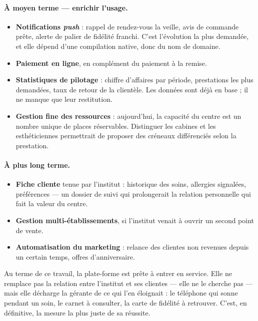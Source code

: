 \paragraph{À moyen terme --- enrichir l'usage.}
\begin{itemize}[leftmargin=1.2cm,nosep]
  \item \textbf{Notifications \textit{push}} : rappel de rendez-vous la veille,
  avis de commande prête, alerte de palier de fidélité franchi. C'est
  l'évolution la plus demandée, et elle dépend d'une compilation native, donc
  du nom de domaine.
  \item \textbf{Paiement en ligne}, en complément du paiement à la remise.
  \item \textbf{Statistiques de pilotage} : chiffre d'affaires par période,
  prestations les plus demandées, taux de retour de la clientèle. Les données
  sont déjà en base ; il ne manque que leur restitution.
  \item \textbf{Gestion fine des ressources} : aujourd'hui, la capacité du
  centre est un nombre unique de places réservables. Distinguer les cabines et
  les esthéticiennes permettrait de proposer des créneaux différenciés selon la
  prestation.
\end{itemize}

\paragraph{À plus long terme.}
\begin{itemize}[leftmargin=1.2cm,nosep]
  \item \textbf{Fiche cliente} tenue par l'institut : historique des soins,
  allergies signalées, préférences --- un dossier de suivi qui prolongerait la
  relation personnelle qui fait la valeur du centre.
  \item \textbf{Gestion multi-établissements}, si l'institut venait à ouvrir un
  second point de vente.
  \item \textbf{Automatisation du marketing} : relance des clientes non revenues
  depuis un certain temps, offres d'anniversaire.
\end{itemize}

\vspace{0.5cm}

Au terme de ce travail, la plate-forme est prête à entrer en service. Elle ne
remplace pas la relation entre l'institut et ses clientes --- elle ne le
cherche pas --- mais elle décharge la gérante de ce qui l'en éloignait : le
téléphone qui sonne pendant un soin, le carnet à consulter, la carte de
fidélité à retrouver. C'est, en définitive, la mesure la plus juste de sa
réussite.
